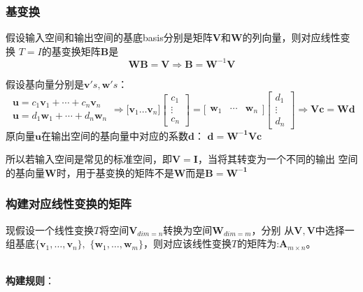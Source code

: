 \subsubsection{基变换}

假设输入空间和输出空间的基底basis分别是矩阵$\boldsymbol{V}$和$\boldsymbol{W}$的列向量，则对应线性变换
$T=I$的基变换矩阵$\boldsymbol{B}$是
$$\boldsymbol{W}\boldsymbol{B} = \boldsymbol{V} \Rightarrow \boldsymbol{B}=\boldsymbol{W}^{-1} \boldsymbol{V}$$

假设基向量分别是$\boldsymbol{v}'s, \boldsymbol{w}'s$：
$$
\begin{array}{c}
    \boldsymbol{u}=c_{1} \boldsymbol{v}_{1}+\cdots+c_{n} \boldsymbol{v}_{n}
    \\
    \boldsymbol{u}=d_{1} \boldsymbol{w}_{1}+\cdots+d_{n} \boldsymbol{w}_{n}
\end{array}
\Rightarrow
\Biggl[\boldsymbol{v}_{1} \ldots \boldsymbol{v}_{n}\Biggr]\left[\begin{array}{c}c_{1} \\ \vdots \\ c_{n}\end{array}\right]=\Biggl[\begin{array}{ccc}\boldsymbol{w}_{1} & \cdots & \boldsymbol{w}_{n}\end{array}\Biggr]\left[\begin{array}{c}d_{1} \\ \vdots \\ d_{n}\end{array}\right]
\Rightarrow
\boldsymbol{V c=W d}
$$
原向量$\boldsymbol{u}$在输出空间的基向量中对应的系数$\boldsymbol{d}$：
$\boldsymbol{d=W^{-1} V c}$

所以若输入空间是常见的标准空间，即$\boldsymbol{V}= \boldsymbol{I}$，当将其转变为一个不同的输出
空间的基向量$\boldsymbol{W}$时，用于基变换的矩阵不是$\boldsymbol{W}$而是$\boldsymbol{B=W^{-1}}$

\subsubsection{构建对应线性变换的矩阵}
现假设一个线性变换$T$将空间$\boldsymbol{V}_{dim=n}$转换为空间$\boldsymbol{W}_{dim=m}$，分别
从$\boldsymbol{V}, \boldsymbol{V}$中选择一组基底$\{\boldsymbol{v}_{1}, \ldots, \boldsymbol{v}_{n}\}, $
$\{\boldsymbol{w}_{1}, \ldots, \boldsymbol{w}_{m}\}$，则对应该线性变换$T$的矩阵为:$\boldsymbol{A}_{m\times n}$。

\hspace*{\fill} \\
\textbf{构建规则}：

